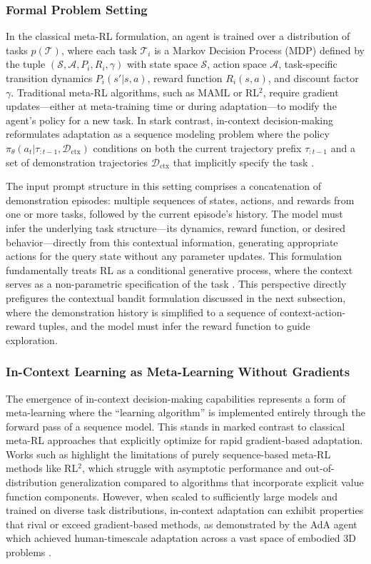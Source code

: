 \documentclass[11pt]{article}
\begin{document}
\subsubsection{Formal Problem Setting}

In the classical meta-RL formulation, an agent is trained over a distribution of tasks \(p(\mathcal{T})\), where each task \(\mathcal{T}_i\) is a Markov Decision Process (MDP) defined by the tuple \((\mathcal{S}, \mathcal{A}, P_i, R_i, \gamma)\) with state space \(\mathcal{S}\), action space \(\mathcal{A}\), task-specific transition dynamics \(P_i(s'|s,a)\), reward function \(R_i(s,a)\), and discount factor \(\gamma\). Traditional meta-RL algorithms, such as MAML or RL\(^2\), require gradient updates---either at meta-training time or during adaptation---to modify the agent's policy for a new task. In stark contrast, in-context decision-making reformulates adaptation as a sequence modeling problem where the policy \(\pi_\theta(a_t | \tau_{:t-1}, \mathcal{D}_{\text{ctx}})\) conditions on both the current trajectory prefix \(\tau_{:t-1}\) and a set of demonstration trajectories \(\mathcal{D}_{\text{ctx}}\) that implicitly specify the task \cite{ref307}.

The input prompt structure in this setting comprises a concatenation of demonstration episodes: multiple sequences of states, actions, and rewards from one or more tasks, followed by the current episode's history. The model must infer the underlying task structure---its dynamics, reward function, or desired behavior---directly from this contextual information, generating appropriate actions for the query state without any parameter updates. This formulation fundamentally treats RL as a conditional generative process, where the context serves as a non-parametric specification of the task \cite{ref308}. This perspective directly prefigures the contextual bandit formulation discussed in the next subsection, where the demonstration history is simplified to a sequence of context-action-reward tuples, and the model must infer the reward function to guide exploration.

\subsubsection{In-Context Learning as Meta-Learning Without Gradients}

The emergence of in-context decision-making capabilities represents a form of meta-learning where the ``learning algorithm'' is implemented entirely through the forward pass of a sequence model. This stands in marked contrast to classical meta-RL approaches that explicitly optimize for rapid gradient-based adaptation. Works such as \cite{ref309} highlight the limitations of purely sequence-based meta-RL methods like RL\(^2\), which struggle with asymptotic performance and out-of-distribution generalization compared to algorithms that incorporate explicit value function components. However, when scaled to sufficiently large models and trained on diverse task distributions, in-context adaptation can exhibit properties that rival or exceed gradient-based methods, as demonstrated by the AdA agent which achieved human-timescale adaptation across a vast space of embodied 3D problems \cite{ref308}.
\end{document}

